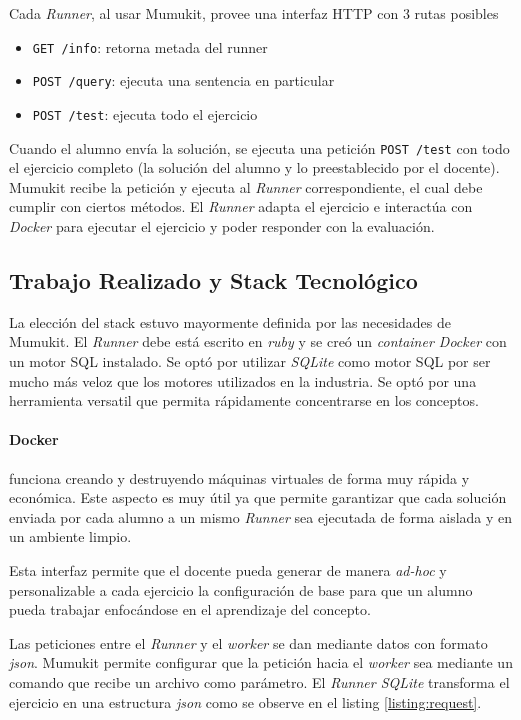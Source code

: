 Cada \textit{Runner}, al usar Mumukit, provee una interfaz HTTP con 3 rutas posibles

\begin{itemize}
    \item \texttt{GET /info}: retorna metada del runner
    \item \texttt{POST /query}: ejecuta una sentencia en particular
    \item \texttt{POST /test}: ejecuta todo el ejercicio
\end{itemize}

Cuando el alumno envía la solución, se ejecuta una petición
\texttt{POST /test} con todo el ejercicio completo (la solución
del alumno y lo preestablecido por el docente). Mumukit
recibe la petición y ejecuta al \textit{Runner} correspondiente,
el cual debe cumplir con ciertos métodos. El \textit{Runner}
adapta el ejercicio e interactúa con \textit{Docker} para
ejecutar el ejercicio y poder responder con la evaluación.


\subsection{Trabajo Realizado y Stack Tecnológico}

La elección del stack estuvo mayormente definida por las necesidades
de Mumukit. El \textit{Runner} debe está escrito en \textit{ruby}
y se creó un \textit{container Docker} con un motor SQL instalado.
Se optó por utilizar \textit{SQLite} como motor SQL
por ser mucho más veloz que los motores utilizados en
la industria. Se optó por una herramienta versatil
que permita rápidamente concentrarse en los conceptos.

\paragraph{Docker} funciona creando y destruyendo
máquinas virtuales de forma muy rápida y económica.
Este aspecto es muy útil ya que permite garantizar
que cada solución enviada por cada alumno a un
mismo \textit{Runner} sea ejecutada de forma aislada
y en un ambiente limpio.

Esta interfaz permite que el docente pueda
generar de manera \textit{ad-hoc} y personalizable
a cada ejercicio la configuración de base
para que un alumno pueda trabajar enfocándose
en el aprendizaje del concepto.

Las peticiones entre el \textit{Runner} y el \textit{worker}
se dan mediante datos con formato \textit{json}.
Mumukit permite configurar que la petición hacia el \textit{worker}
sea mediante un comando que recibe un archivo como parámetro.
El \textit{Runner SQLite} transforma el ejercicio en una estructura
\textit{json} como se observe en el listing \ref{listing:request}.

